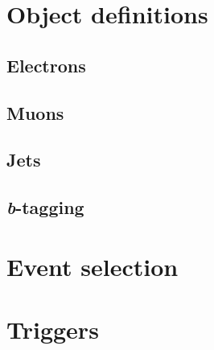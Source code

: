 \section{Object definitions}

\subsection{Electrons}

\subsection{Muons}

\subsection{Jets}

\subsection{\textit{b}-tagging}


\section{Event selection}

\section{Triggers}